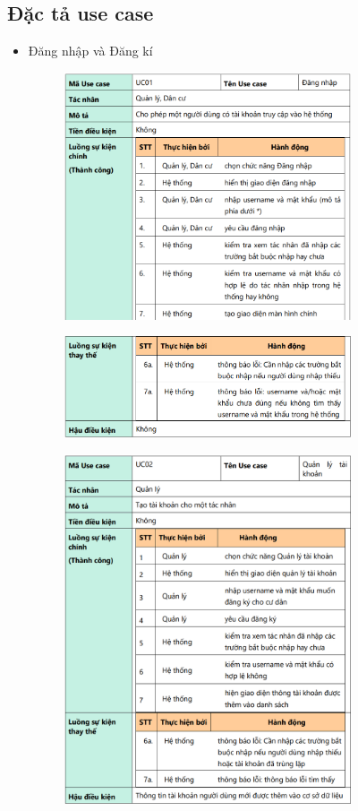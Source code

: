 \documentclass{article}
\begin{document}
\subsection{Đặc tả use case}
\begin{itemize}
    \item Đăng nhập và Đăng kí
    \begin{figure}[H]
        \centering
        \includegraphics[width=0.8\textwidth]{Ảnh chương 2/UC01 1.png}
    \end{figure}
    \begin{figure}[H]
        \centering
        \includegraphics[width=0.8\textwidth]{Ảnh chương 2/UC01.png}
    \end{figure}
    \begin{figure}[H]
        \centering
        \includegraphics[width=0.8\textwidth]{Ảnh chương 2/UC02.png}

\end{figure}
\end{itemize}
\end{document}
